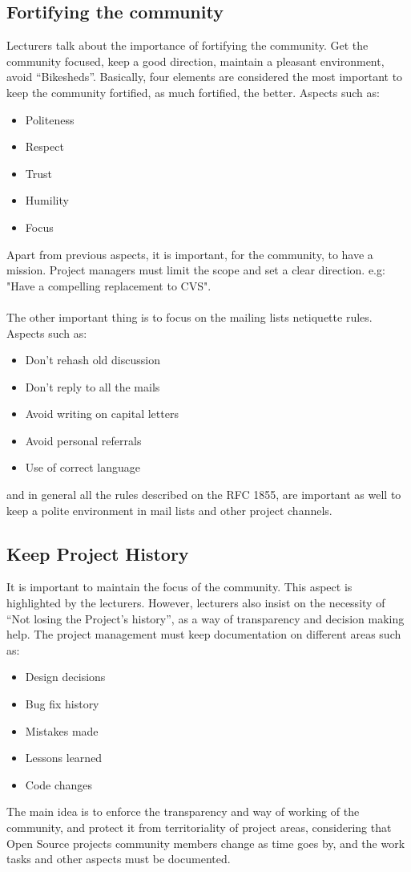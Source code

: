 \documentclass[11pt]{article}
\begin{document}
\subsection{Fortifying the community}
Lecturers talk about the importance of fortifying the community. Get the community focused, keep a good direction, maintain a pleasant environment, avoid ``Bikesheds''.
  Basically, four elements are considered the most important to keep the community fortified, as much fortified, the better. Aspects such as:
\begin{itemize}\itemsep0pt
\item{Politeness}
\item{Respect}
\item{Trust}
\item{Humility}
\item{Focus}
\end{itemize}
Apart from previous aspects, it is important, for the community, to have a mission. Project managers must limit the scope and set a clear direction. e.g: "Have a compelling replacement to CVS".\\
\\
The other important thing is to focus on the mailing lists netiquette rules. Aspects such as:
\begin{itemize}\itemsep0pt
\item{Don't rehash old discussion}
\item{Don't reply to all the mails}
\item{Avoid writing on capital letters}
\item{Avoid personal referrals}
\item{Use of correct language}
\end{itemize}
and in general all the rules described on the RFC 1855, are important as well to keep a polite environment in mail lists and other project channels.
\subsection{Keep Project History}
It is important to maintain the focus of the community. This aspect is highlighted by the lecturers. However, lecturers also insist on the necessity of ``Not losing the Project's history'', as a way of transparency and decision making help. The project management must keep documentation on different areas such as:
\begin{itemize}\itemsep0pt
\item{Design decisions}
\item{Bug fix history}
\item{Mistakes made}
\item{Lessons learned}
\item{Code changes}
\end{itemize}
The main idea is to enforce the transparency and way of working of the community, and protect it from territoriality of project areas, considering that Open Source projects community members change as time goes by, and the work tasks and other aspects must be documented.
\end{document}
